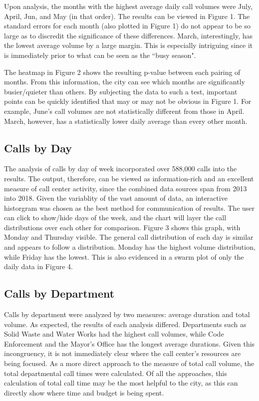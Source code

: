 \documentclass{article}
\begin{document}
Upon analysis, the months with the highest average daily call volumes were July, April, Jun, and May (in that order).  The results can be viewed in Figure 1.  The standard errors for each month (also plotted in Figure 1) do not appear to be so large as to discredit the significance of these differences.  March, interestingly, has the lowest average volume by a large margin.  This is especially intriguing since it is immediately prior to what can be seen as the ``busy season".

The heatmap in Figure 2 shows the resulting p-value between each pairing of months.  From this information, the city can see which months are significantly busier/quieter than others.  By subjecting the data to such a test, important points can be quickly identified that may or may not be obvious in Figure 1.  For example, June's call volumes are not statistically different from those in April.  March, however, has a statistically lower daily average than every other month.


	\subsection{Calls by Day}

The analysis of calls by day of week incorporated over 588,000 calls into the results.  The output, therefore, can be viewed as information-rich and an excellent measure of call center activity, since the combined data sources span from 2013 into 2018.  Given the variablity of the vast amount of data, an interactive historgram was chosen as the best method for communication of results.  The user can click to show/hide days of the week, and the chart will layer the call distributions over each other for comparison.  Figure 3 shows this graph, with Monday and Thursday visible.  The general call distribution of each day is similar and appears to follow a 
distribution.  Monday has the highest volume distribution, while Friday has the lowest.  This is also evidenced in a swarm plot of only the daily data in Figure 4.


	\subsection{Calls by Department}

Calls by department were analyzed by two measures:  average duration and total volume.  As expected, the results of each analysis differed.  Departments such as Solid Waste and Water Works had the highest call volumes, while Code Enforcement and the Mayor's Office has the longest average durations.  Given this incongruency, it is not immediately clear where the call center's resources are being focused.  As a more direct approach to the measure of total call volume, the total departmental call times were calculated.  Of all the approaches, this calculation of total call time may be the most helpful to the city, as this can directly show where time and budget is being spent.
\end{document}
